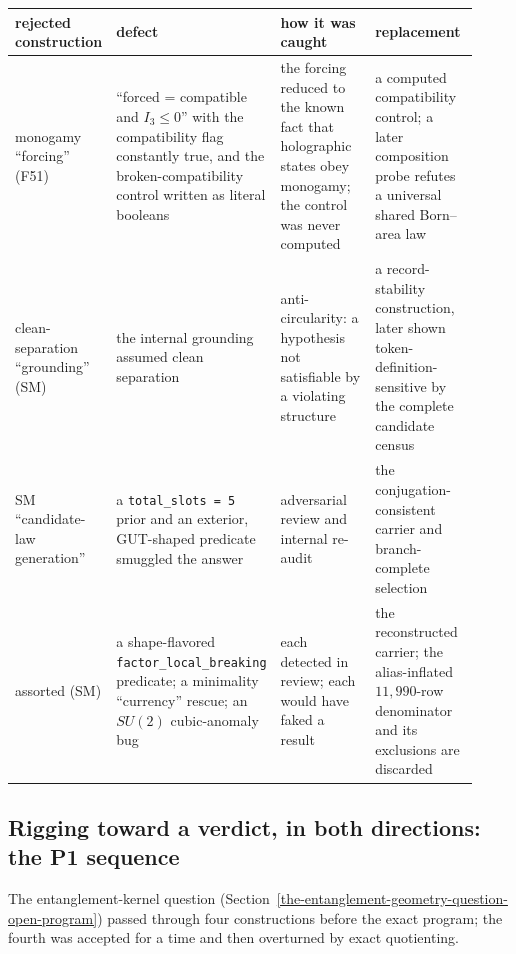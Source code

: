\documentclass[11pt]{article}
\theoremstyle{definition}
\begin{document}
\begin{center}
\small
\begin{longtable}[]{@{}p{0.2\linewidth}p{0.27\linewidth}p{0.22\linewidth}p{0.23\linewidth}@{}}
\toprule
rejected construction & defect & how it was caught & replacement\\
\midrule
\endhead
monogamy ``forcing'' (F51) & ``forced = compatible and \(I_3\le0\)'' with the compatibility flag constantly true, and
the broken-compatibility control written as literal booleans & the forcing reduced to the known fact that holographic
states obey monogamy; the control was never computed & a computed compatibility control; a later composition probe
refutes a universal shared Born--area law\\
clean-separation ``grounding'' (SM) & the internal grounding assumed clean separation & anti-circularity: a hypothesis
not satisfiable by a violating structure & a record-stability construction, later shown token-definition-sensitive by
the complete candidate census\\
SM ``candidate-law generation'' & a \texttt{total\_slots = 5} prior and an exterior, GUT-shaped predicate smuggled the
answer & adversarial review and internal re-audit & the conjugation-consistent carrier and branch-complete
selection\\
assorted (SM) & a shape-flavored \texttt{factor\_local\_breaking} predicate; a minimality ``currency'' rescue; an
\(SU(2)\) cubic-anomaly bug & each detected in review; each would have faked a result & the reconstructed carrier; the
alias-inflated \(11{,}990\)-row denominator and its exclusions are discarded\\
\bottomrule
\end{longtable}
\end{center}

\subsection{Rigging toward a verdict, in both directions: the P1 sequence}\label{rigging-toward-a-desired-verdict-both-directions-prediction-1s-four-attempts}

The entanglement-kernel question (Section~\ref{the-entanglement-geometry-question-open-program}) passed through four
constructions before the exact program; the fourth was accepted for a time and then overturned by exact quotienting.
\end{document}

